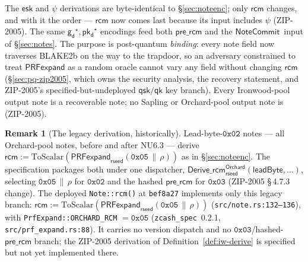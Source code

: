 \documentclass[11pt,a4paper]{article}
\theoremstyle{definition}
\newtheorem{remark}[theorem]{Remark}
\newcommand{\NoteCommit}{\ensuremath{\mathsf{NoteCommit}}}
\newcommand{\pkd}{\ensuremath{\mathsf{pk_d}}}
\newcommand{\gd}{\ensuremath{\mathsf{g_d}}}
\newcommand{\rcm}{\ensuremath{\mathsf{rcm}}}
\begin{document}
The $\mathsf{esk}$ and $\psi$ derivations are byte-identical to
\S\ref{sec:noteenc}; only $\rcm$ changes, and with it the order --- $\rcm$
now comes last because its input includes $\psi$ (ZIP-2005). The same
$\gd^\star, \pkd^\star$ encodings feed both $\mathsf{pre\_rcm}$ and the
\NoteCommit\ input of \S\ref{sec:notes}. The purpose is post-quantum
\emph{binding}: every note field now traverses BLAKE2b on the way to the
trapdoor, so an adversary constrained to treat $\mathsf{PRFexpand}$ as a
random oracle cannot vary any field without changing $\rcm$
(\S\ref{sec:pq-zip2005}, which owns the security analysis, the recovery
statement, and ZIP-2005's specified-but-undeployed
$\mathsf{qsk}/\mathsf{qk}$ key branch). Every Ironwood-pool output note is a
recoverable note; no Sapling or Orchard-pool output note is (ZIP-2005).

\begin{remark}[The legacy derivation, historically]\label{rem:iw-legacy-rcm}
Lead-byte-$\mathtt{0x02}$ notes --- all Orchard-pool notes, before and after
NU6.3 --- derive
$\rcm := \mathrm{ToScalar}(\mathsf{PRFexpand}_{\mathsf{rseed}}(\mathtt{0x05}
\,\|\, \rho))$ as in \S\ref{sec:noteenc}. The specification packages both
under one dispatcher,
$\mathsf{Derive\_rcm}^{\mathsf{Orchard}}_{\mathsf{rseed}}(\mathsf{leadByte},
\ldots)$, selecting $\mathtt{0x05} \,\|\, \rho$ for $\mathtt{0x02}$ and the
hashed $\mathsf{pre\_rcm}$ for $\mathtt{0x03}$ (ZIP-2005 \S\,4.7.3 change).
The deployed \texttt{Note::rcm()} at \texttt{bef8a27} implements only this
legacy branch: $\rcm := \mathrm{ToScalar}(\mathsf{PRFexpand}_{\mathsf{rseed}}
(\mathtt{0x05} \,\|\, \rho))$ (\texttt{src/note.rs:132--136}), with
\texttt{PrfExpand::ORCHARD\_RCM} $= \mathtt{0x05}$ (\texttt{zcash\_spec}~0.2.1,
\texttt{src/prf\_expand.rs:88}). It carries no version dispatch and no
$\mathtt{0x03}$/hashed-$\mathsf{pre\_rcm}$ branch; the ZIP-2005 derivation of
Definition~\ref{def:iw-derive} is specified but not yet implemented there.
\end{remark}
\end{document}
